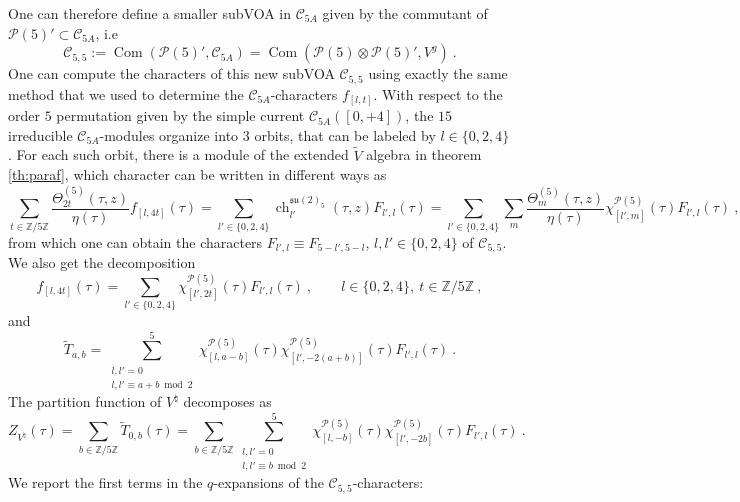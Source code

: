 \documentclass[11pt,reqno]{article}
\newcommand{\be}{\begin{equation}}
\newcommand{\ee}{\end{equation}}
\newcommand{\calC}{\mathcal{C}}
\DeclareMathOperator{\Com}{Com}
\newcommand{\ZZ}{\mathbb{Z}}
\newcommand{\paraf}{\mathcal{P}}
\newcommand{\alg}[1]{\mathfrak{#1}}
\DeclareMathOperator{\ch}{ch}
\begin{document}
One can therefore define a smaller subVOA in $\calC_{5A}$ given by the commutant of $\paraf(5)'\subset \calC_{5A}$, i.e
\be \calC_{5,5}:=\Com(\paraf(5)',\calC_{5A})=\Com(\paraf(5)\otimes \paraf(5)',V^g)\ .
\ee
One can compute the characters of this new subVOA $\calC_{5,5}$ using exactly the same method that we used to determine the $\calC_{5A}$-characters $f_{[l,t]}$. With respect to the order $5$ permutation given by the simple current $\calC_{5A}([0,+4])$, the $15$ irreducible $\calC_{5A}$-modules organize into $3$ orbits, that can be labeled by $l\in \{0,2,4\}$. For each such orbit, there is a module of the extended $\tilde V$ algebra in theorem \ref{th:paraf}, which character can be written in different ways as
\be \sum_{t\in \ZZ/5\ZZ} \frac{\Theta^{(5)}_{2t}(\tau,z)}{\eta(\tau)} f_{[l,4t]}(\tau)=\sum_{l'\in\{0,2,4\}}\ch^{\alg{su}(2)_5}_{l'}(\tau,z)F_{l',l}(\tau)=\sum_{l'\in\{0,2,4\}}\sum_m \frac{\Theta^{(5)}_m(\tau,z)}{\eta(\tau)} \chi^{\paraf(5)}_{[l',m]}(\tau)F_{l',l}(\tau)\ ,
\ee from which one can obtain the characters $F_{l',l}\equiv F_{5-l',5-l}$, $l,l'\in \{0,2,4\}$ of $\calC_{5,5}$. We also get the decomposition
\be f_{[l,4t]}(\tau)=\sum_{l'\in\{0,2,4\}}\chi^{\paraf(5)}_{[l',2t]}(\tau)F_{l',l}(\tau)\ ,\qquad l\in\{0,2,4\},\ t\in \ZZ/5\ZZ\ ,
\ee and
\be \tilde T_{a,b}=\sum_{\substack{l,l'=0\\ l,l'\equiv a+b\bmod 2}}^5\chi^{\paraf(5)}_{[l,a-b]}(\tau)\chi^{\paraf(5)}_{[l',-2(a+b)]}(\tau)F_{l',l}(\tau)\ .
\ee The partition function of $V^\natural$ decomposes as
\be Z_{V^\natural}(\tau)=\sum_{b\in \ZZ/5\ZZ} \tilde T_{0,b}(\tau)=\sum_{b\in \ZZ/5\ZZ} \sum_{\substack{l,l'=0\\ l,l'\equiv b\bmod 2}}^5\chi^{\paraf(5)}_{[l,-b]}(\tau)\chi^{\paraf(5)}_{[l',-2b]}(\tau)F_{l',l}(\tau)\ .
\ee
We report the first terms in the $q$-expansions of the $\calC_{5,5}$-characters:
\end{document}
